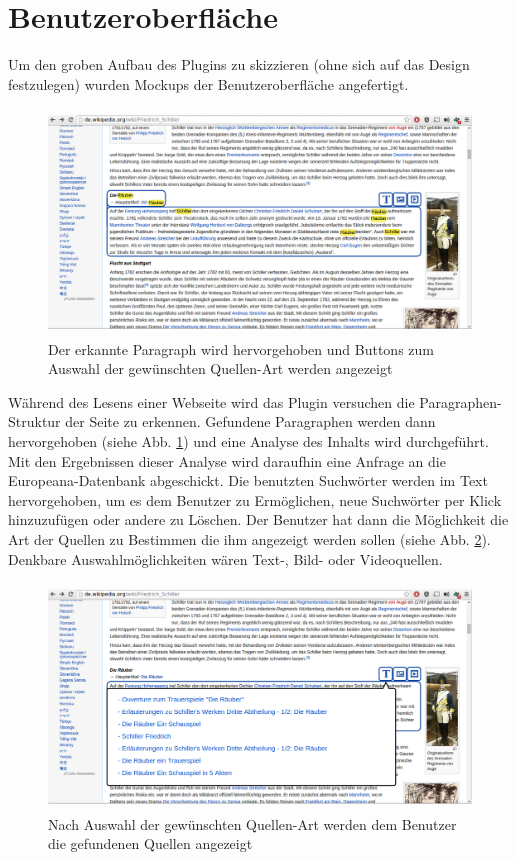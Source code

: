\documentclass{llncs}
\begin{document}
\section{Benutzeroberfläche}
Um den groben Aufbau des Plugins zu skizzieren (ohne sich auf das Design festzulegen) wurden Mockups der Benutzeroberfläche angefertigt.

\begin{figure}{}
\centering
\includegraphics[height=6cm]{images/plugin_paragraph.png}
\caption{Der erkannte Paragraph wird hervorgehoben und Buttons zum Auswahl der gewünschten Quellen-Art werden angezeigt}
\label{fig:paragraph}
\end{figure}
Während des Lesens einer Webseite wird das Plugin versuchen die Paragraphen-Struktur der Seite zu erkennen. Gefundene Paragraphen werden dann hervorgehoben (siehe Abb. \ref{fig:paragraph}) und eine Analyse des Inhalts wird durchgeführt. Mit den Ergebnissen dieser Analyse wird daraufhin eine Anfrage an die Europeana-Datenbank abgeschickt. Die benutzten Suchwörter werden im Text hervorgehoben, um es dem Benutzer zu Ermöglichen, neue Suchwörter per Klick hinzuzufügen oder andere zu Löschen. 
\newline
Der Benutzer hat dann die Möglichkeit die Art der Quellen zu Bestimmen die ihm angezeigt werden sollen (siehe Abb. \ref{fig:sources}). Denkbare Auswahlmöglichkeiten wären Text-, Bild- oder Videoquellen.

\begin{figure}{}
\centering
\includegraphics[height=6cm]{images/plugin_showSources.png}
\caption{Nach Auswahl der gewünschten Quellen-Art werden dem Benutzer die gefundenen Quellen angezeigt}
\label{fig:sources}
\end{figure}
\end{document}

